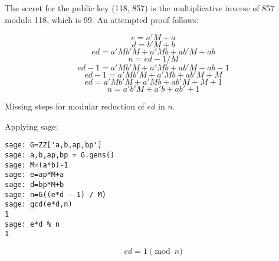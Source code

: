\documentclass{article}
\begin{document}
The secret for the public key (118, 857) is the multiplicative inverse of 857 modulo 118, which is 99.
An attempted proof follows:
\newpage

\[ e = a'M + a \]
\[ d = b'M + b \]
\[ ed = a'Mb'M + a'Mb + ab'M + ab \]
\[ n = ed-1/M \]
\[ ed-1 = a'Mb'M + a'Mb + ab'M + ab -1 \]
\[ ed-1 = a'Mb'M + a'Mb + ab'M + M \]
\[ ed = a'Mb'M + a'Mb + ab'M + M + 1 \]
\[ n =  a'b'M + a'b + ab' + 1 \]

Missing steps for modular reduction of $ed$ in $n$.

Applying sage:
\begin{verbatim}
sage: G=ZZ['a,b,ap,bp']
sage: a,b,ap,bp = G.gens()
sage: M=(a*b)-1
sage: e=ap*M+a
sage: d=bp*M+b
sage: n=G((e*d - 1) / M)
sage: gcd(e*d,n)
1
sage: e*d % n
1
\end{verbatim}

\[ ed = 1 \pmod n \]
\end{document}
